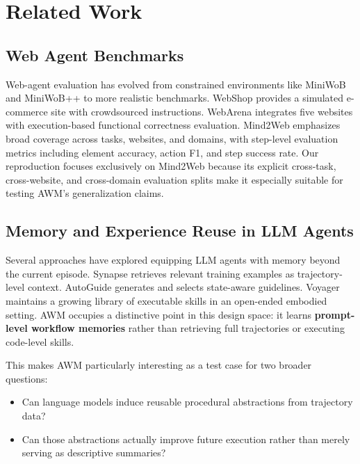 \documentclass{article}
\providecommand{\tightlist}{%
  \setlength{\itemsep}{0pt}\setlength{\parskip}{0.8em}}
\begin{document}
\section{Related Work}\label{related-work}

\subsection{Web Agent Benchmarks}\label{web-agent-benchmarks}

Web-agent evaluation has evolved from constrained environments like
MiniWoB \parencite{shi2017world} and MiniWoB++
\parencite{liu2018reinforcement} to more realistic benchmarks. WebShop
\parencite{yao2022webshop} provides a simulated e-commerce site with
crowdsourced instructions. WebArena \parencite{zhou2023webarena}
integrates five websites with execution-based functional correctness
evaluation. Mind2Web \parencite{deng2023mind2web} emphasizes broad
coverage across tasks, websites, and domains, with step-level evaluation
metrics including element accuracy, action F1, and step success rate.
Our reproduction focuses exclusively on Mind2Web because its explicit
cross-task, cross-website, and cross-domain evaluation splits make it
especially suitable for testing AWM's generalization claims.

\subsection{Memory and Experience Reuse in LLM
Agents}\label{memory-and-experience-reuse-in-llm-agents}

Several approaches have explored equipping LLM agents with memory beyond
the current episode. Synapse
\parencite{zheng2024synapsetrajectoryasexemplarpromptingmemory}
retrieves relevant training examples as trajectory-level context.
AutoGuide \parencite{fu2024autoguide} generates and selects state-aware
guidelines. Voyager \parencite{wang2023voyager} maintains a growing
library of executable skills in an open-ended embodied setting. AWM
occupies a distinctive point in this
design space: it learns \textbf{prompt-level workflow memories} rather
than retrieving full trajectories or executing code-level skills.

This makes AWM particularly interesting as a test case for two broader
questions:

\begin{itemize}
\tightlist
\item
  Can language models induce reusable procedural abstractions from
  trajectory data?
\item
  Can those abstractions actually improve future execution rather than
  merely serving as descriptive summaries?
\end{itemize}
\end{document}
